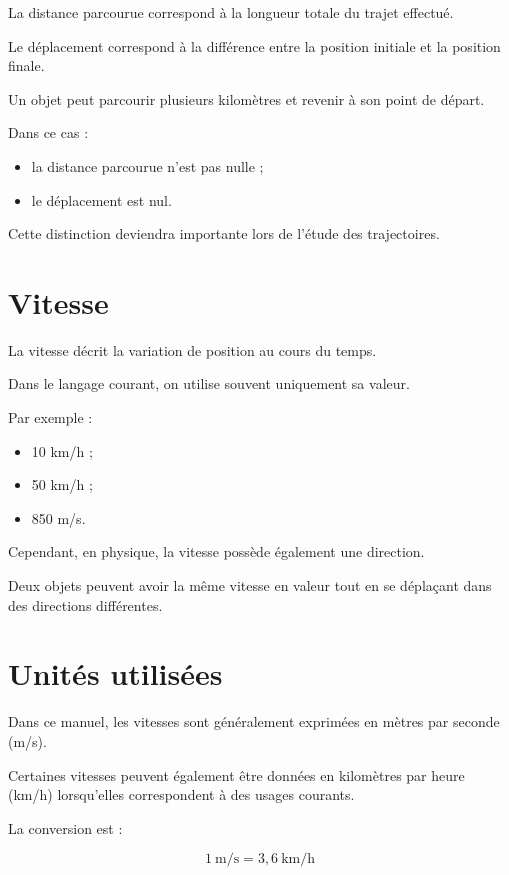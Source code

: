 La distance parcourue correspond à la longueur totale du trajet effectué.

Le déplacement correspond à la différence entre la position initiale et la
position finale.

Un objet peut parcourir plusieurs kilomètres et revenir à son point de départ.

Dans ce cas :

\begin{itemize}
    \item la distance parcourue n'est pas nulle ;
    \item le déplacement est nul.
\end{itemize}

Cette distinction deviendra importante lors de l'étude des trajectoires.

\section{Vitesse}

La vitesse décrit la variation de position au cours du temps.

Dans le langage courant, on utilise souvent uniquement sa valeur.

Par exemple :

\begin{itemize}
    \item 10 km/h ;
    \item 50 km/h ;
    \item 850 m/s.
\end{itemize}

Cependant, en physique, la vitesse possède également une direction.

Deux objets peuvent avoir la même vitesse en valeur tout en se déplaçant dans
des directions différentes.

\section{Unités utilisées}

Dans ce manuel, les vitesses sont généralement exprimées en mètres par
seconde (m/s).

Certaines vitesses peuvent également être données en kilomètres par heure
(km/h) lorsqu'elles correspondent à des usages courants.

La conversion est :

\begin{equation}
1~\mathrm{m/s}=3,6~\mathrm{km/h}
\end{equation}

